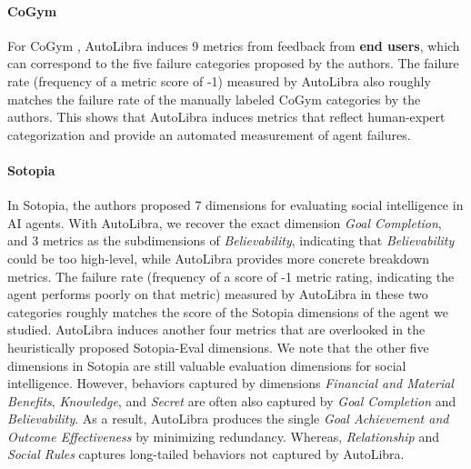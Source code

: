 \paragraph{CoGym}
For CoGym \citep{shao2024collaborative}, AutoLibra induces 9 metrics from
feedback from \textbf{end users}, which can correspond to the five failure
categories proposed by the authors. The failure rate (frequency of a metric
score of -1) measured by AutoLibra also roughly matches the failure rate of the
manually labeled CoGym categories by the authors. This shows that AutoLibra induces
metrics that reflect human-expert categorization and provide an automated measurement
of agent failures.


\paragraph{Sotopia}
In Sotopia, the authors \citep{zhousotopia} proposed 7 dimensions for evaluating
social intelligence in AI agents. With AutoLibra, we recover the exact dimension
\emph{Goal Completion}, and 3 metrics as the subdimensions of \emph{Believability},
indicating that \textit{Believability} could be too high-level, while AutoLibra provides
more concrete breakdown metrics. The failure rate (frequency of a score of -1
metric rating, indicating the agent performs poorly on that metric) measured by
AutoLibra in these two categories roughly matches the score of the Sotopia
dimensions of the agent we studied. AutoLibra induces another four metrics that are
overlooked in the heuristically proposed Sotopia-Eval dimensions. We note that
the other five dimensions in Sotopia are still valuable evaluation dimensions
for social intelligence. However, behaviors captured by dimensions \emph{Financial
and Material Benefits}, \emph{Knowledge}, and \emph{Secret} are often also captured
by \textit{Goal Completion} and \textit{Believability}. As a result, AutoLibra produces
the single \textit{Goal Achievement and Outcome Effectiveness} by minimizing
redundancy. Whereas, \textit{Relationship} and \textit{Social Rules} captures
long-tailed behaviors not captured by AutoLibra.

